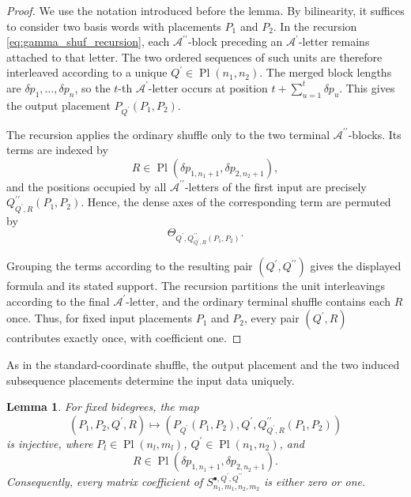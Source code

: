 \documentclass{amsart}
\newtheorem{lemma}[theorem]{Lemma}
\theoremstyle{definition}
\theoremstyle{remark}
\begin{document}
\begin{proof}
We use the notation introduced before the lemma. By bilinearity, it
suffices to consider two basis words with placements $P_1$ and $P_2$. In
the recursion \eqref{eq:gamma_shuf_recursion}, each
$\mathcal{A}^{\prime\prime}$-block preceding an
$\mathcal{A}^{\prime}$-letter remains attached to that letter. The two
ordered sequences of such units are therefore interleaved according to a
unique $Q^{\prime}\in\operatorname{Pl}(n_1,n_2)$. The merged block
lengths are $\delta p_1,\ldots,\delta p_n$, so the $t$-th
$\mathcal{A}^{\prime}$-letter occurs at position
$t+\sum_{u=1}^{t}\delta p_u$. This gives the output placement
$P_{Q^{\prime}}(P_1,P_2)$.

The recursion applies the ordinary shuffle only to the two terminal
$\mathcal{A}^{\prime\prime}$-blocks. Its terms are indexed by
\[
    R
    \in
    \operatorname{Pl}
    \left(
        \delta p_{1,n_1+1},
        \delta p_{2,n_2+1}
    \right),
\]
and the positions occupied by all
$\mathcal{A}^{\prime\prime}$-letters of the first input are precisely
$Q^{\prime\prime}_{Q^{\prime},R}(P_1,P_2)$. Hence, the dense axes of the
corresponding term are permuted by
\[
    \Theta_{
        Q^{\prime},
        Q^{\prime\prime}_{Q^{\prime},R}(P_1,P_2)
    }.
\]

Grouping the terms according to the resulting pair
$(Q^{\prime},Q^{\prime\prime})$ gives the displayed formula and
its stated support. The recursion partitions the unit interleavings
according to the final $\mathcal{A}^{\prime}$-letter, and the ordinary
terminal shuffle contains each $R$ once. Thus, for fixed input placements
$P_1$ and $P_2$, every pair $(Q^{\prime},R)$ contributes exactly once,
with coefficient one.
\end{proof}

As in the standard-coordinate shuffle, the output placement and the two
induced subsequence placements determine the input data uniquely.

\begin{lemma}
\label{lem:gamma_shuffle_pullback}
For fixed bidegrees, the map
\[
    \left(
        P_1,P_2,Q^{\prime},R
    \right)
    \longmapsto
    \left(
        P_{Q^{\prime}}(P_1,P_2),
        Q^{\prime},
        Q^{\prime\prime}_{Q^{\prime},R}(P_1,P_2)
    \right)
\]
is injective, where
$P_l\in\operatorname{Pl}(n_l,m_l)$,
$Q^{\prime}\in\operatorname{Pl}(n_1,n_2)$, and
\[
    R
    \in
    \operatorname{Pl}
    \left(
        \delta p_{1,n_1+1},
        \delta p_{2,n_2+1}
    \right).
\]
Consequently, every matrix coefficient of
$S^{\bullet,Q^{\prime},Q^{\prime\prime}}_{n_1,m_1,n_2,m_2}$
is either zero or one.
\end{lemma}
\end{document}
